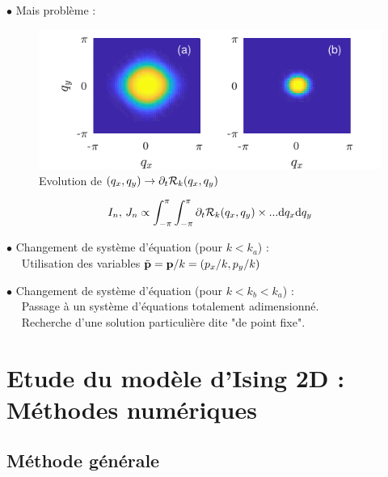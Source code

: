 \documentclass[9pt]{beamer}
\begin{document}
	
	\begin{frame}
	\justifying
	\vspace*{22pt}
	
	$\bullet$ Mais problème :
	
	\begin{figure}[H]
\begin{center}
\includegraphics[scale = 0.9]{DerRegIsing.pdf}
\caption{Evolution de $(q_x, q_y) \to \partial_t \mathcal{R}_k(q_x, q_y)$}
	\label{fig:schemaIsing}
	\end{center}
\end{figure}
\vspace*{-5pt}
\begin{equation*}
	I_n, \, J_n \propto \int_{-\pi}^{\pi}\int_{-\pi}^{\pi} \partial_t \mathcal{R}_k(q_x, q_y) \times ... \text{d} q_x \text{d} q_y
\end{equation*}

$\bullet$ Changement de système d'équation (pour $k<k_a$) :\\
$\quad$ Utilisation des variables $\tilde{{\bf p}} = {\bf p}/k = (p_x/k, p_y/k)$ \\
\vspace*{8pt}
	
	
	$\bullet$ Changement de système d'équation (pour $k<k_b< k_a$) :\\
$\quad$ Passage à un système d'équations totalement adimensionné. \\
$\quad$ Recherche d'une solution particulière dite "de point fixe".

	
		\end{frame}
	
	\section{Etude du modèle d'Ising 2D : Méthodes numériques}
	\subsection{Méthode générale}
	
\end{document}
